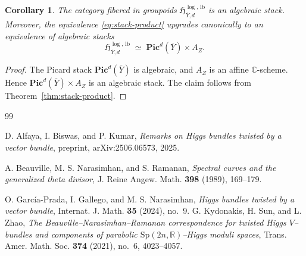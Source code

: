 \documentclass[a4paper,12pt]{amsart}
\numberwithin{equation}{section}
\newtheorem{corollary}[theorem]{Corollary}
\theoremstyle{definition}
\newcommand{\CC}{\mathbb C}
\begin{document}
\begin{corollary}\label{cor:algebraicity-enhanced-stack}
The category fibered in groupoids \(\mathfrak H^{\log,\,\mathrm{lb}}_{\overline{Y},d}\) is an algebraic stack.  Moreover, the equivalence \eqref{eq:stack-product} upgrades canonically to an equivalence of algebraic stacks
\[
\mathfrak H^{\log,\,\mathrm{lb}}_{\overline{Y},d}
\;\simeq\;
\mathbf{Pic}^d(\overline{Y})\times A_Z.
\]
\end{corollary}
\begin{proof}
The Picard stack \(\mathbf{Pic}^d(\overline{Y})\) is algebraic, and \(A_Z\) is an affine \(\CC\)-scheme.  Hence \(\mathbf{Pic}^d(\overline{Y})\times A_Z\) is an algebraic stack.  The claim follows from Theorem~\ref{thm:stack-product}.
\end{proof}


\medskip 


\begin{thebibliography}{99}

D. Alfaya, I. Biswas, and P. Kumar,
\emph{Remarks on Higgs bundles twisted by a vector bundle},
preprint, arXiv:2506.06573, 2025.

A. Beauville, M. S. Narasimhan, and S. Ramanan,
\emph{Spectral curves and the generalized theta divisor},
J. Reine Angew. Math. \textbf{398} (1989), 169--179.

O. Garc\'ia-Prada, I. Gallego, and M. S. Narasimhan,
\emph{Higgs bundles twisted by a vector bundle},
Internat. J. Math. \textbf{35} (2024), no.~9.
G. Kydonakis, H. Sun, and L. Zhao,
\emph{The Beauville--Narasimhan--Ramanan correspondence for twisted Higgs $V$--bundles and components of parabolic $\mathrm{Sp}(2n,\mathbb{R})$--Higgs moduli spaces},
Trans. Amer. Math. Soc. \textbf{374} (2021), no.~6, 4023--4057.
\end{thebibliography}
\end{document}
